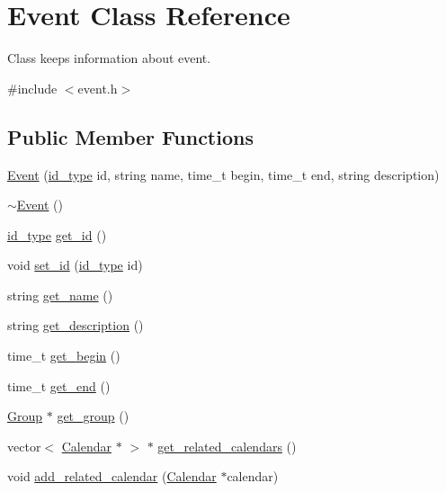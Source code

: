 \hypertarget{classEvent}{
\section{Event Class Reference}
\label{d5/da5/classEvent}
}


Class keeps information about event.  




{\ttfamily \#include $<$event.h$>$}

\subsection*{Public Member Functions}
\begin{DoxyCompactItemize}
\item 
\hyperlink{classEvent_a150a1c9476acae579c6664d8736a59c1}{Event} (\hyperlink{types_8h_a0b60c08a3ab1435cccc5643d32d8ccee}{id\_\-type} id, string name, time\_\-t begin, time\_\-t end, string description)
\item 
\hyperlink{classEvent_a7704ec01ce91e673885792054214b3d2}{$\sim$Event} ()
\item 
\hyperlink{types_8h_a0b60c08a3ab1435cccc5643d32d8ccee}{id\_\-type} \hyperlink{classEvent_aa82316746fdf73be1da9b5b8840f5e2d}{get\_\-id} ()
\item 
void \hyperlink{classEvent_a69a17e50e894d6ef113b7895ff6d517f}{set\_\-id} (\hyperlink{types_8h_a0b60c08a3ab1435cccc5643d32d8ccee}{id\_\-type} id)
\item 
string \hyperlink{classEvent_a99325a5304e3b73cd4df1f356a185cfc}{get\_\-name} ()
\item 
string \hyperlink{classEvent_a07fdb4a55424b028bfb64db3cea94c07}{get\_\-description} ()
\item 
time\_\-t \hyperlink{classEvent_aa0177bde2838d761774f6e9a50f1e76c}{get\_\-begin} ()
\item 
time\_\-t \hyperlink{classEvent_a25baaf84cc87da4b866f266f946c1d8f}{get\_\-end} ()
\item 
\hyperlink{classGroup}{Group} $\ast$ \hyperlink{classEvent_a5736ec29101416a0358b709c964bf50d}{get\_\-group} ()
\item 
vector$<$ \hyperlink{classCalendar}{Calendar} $\ast$ $>$ $\ast$ \hyperlink{classEvent_ab2329f2021caee686920d5ab2cfa8569}{get\_\-related\_\-calendars} ()
\item 
void \hyperlink{classEvent_a1d59dc31b3358bb9d9d1e75cb735c6ef}{add\_\-related\_\-calendar} (\hyperlink{classCalendar}{Calendar} $\ast$calendar)
\item 

\end{DoxyCompactItemize}
